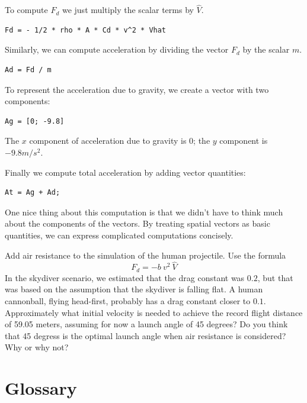 \documentclass{book}
\begin{document}
To compute $F_d$ we just multiply the scalar terms by $\hat{V}$.

\begin{verbatim}
Fd = - 1/2 * rho * A * Cd * v^2 * Vhat
\end{verbatim}

Similarly, we can compute acceleration by dividing the vector
$F_d$ by the scalar $m$.

\begin{verbatim}
Ad = Fd / m
\end{verbatim}

To represent the acceleration due to gravity, we create a vector 
with two components:

\begin{verbatim}
Ag = [0; -9.8]
\end{verbatim}

The $x$ component of acceleration due to gravity is 0; the $y$ component is $-9.8 m/s^2$.

Finally we compute total acceleration by adding vector
quantities:

\begin{verbatim}
At = Ag + Ad;
\end{verbatim}

One nice thing about this computation is that we didn't have to
think much about the components of the vectors.  By treating
spatial vectors as basic quantities, we can express complicated computations
concisely.

\begin{ex}
Add air resistance to the simulation of the human projectile.  
Use the formula 
\[ F_d = -b ~ v^2 ~ \hat{V}   \]
In
the skydiver scenario, we estimated that the drag constant was
$0.2$, but that was based on the assumption that the skydiver is
falling flat.  A human cannonball, flying head-first, probably
has a drag constant closer to $0.1$.  Approximately what initial velocity
is needed to achieve the record flight distance of 59.05 meters,
assuming
for now a launch angle of 45 degrees?
Do you think that 45 degress is the optimal launch angle when 
air resistance is considered?  Why or why not?
\end{ex}


\section{Glossary}
\end{document}
